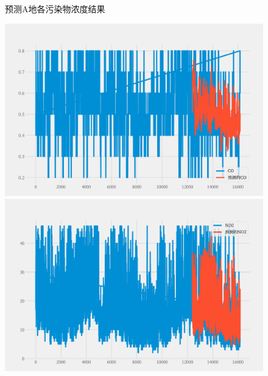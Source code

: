 \documentclass[a4paper,10pt]{my_paper}
\numberwithin{equation}{section}
\begin{document}
\begin{figure}[htbp]
\begin{minipage}[c]{0.3\textwidth}
		\end{minipage}
\caption{预测A地各污染物浓度结果}\label{fig_Q3A地预测图}
\end{figure}

\begin{figure}[htbp]
	\centering
		\begin{minipage}[c]{0.3\textwidth} %
			\centering
			\includegraphics[width=1\textwidth]{prob3/预测B地_CO.pdf} %
		\end{minipage}%
		\begin{minipage}[c]{0.3\textwidth}
			\centering
			\includegraphics[width=1\textwidth]{prob3/预测B地_NO2.pdf}
		\end{minipage}
		\begin{minipage}[c]{0.3\textwidth}
			\centering

\end{minipage}
\end{figure}
\end{document}
